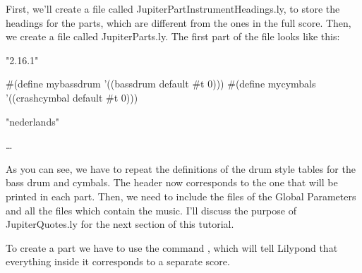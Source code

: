 \documentclass[../../LilyPond-Tutorials]{subfiles}
\begin{document}
First, we'll create a file called JupiterPartInstrumentHeadings.ly, to store the headings for the parts, which are different from the ones in the full score.
Then, we create a file called JupiterParts.ly.
The first part of the file looks like this:

\begin{lilypondcode}
\version "2.16.1"


#(define mybassdrum '((bassdrum default #t 0)))
#(define mycymbals '((crashcymbal default #t 0)))


\language "nederlands"








…



\end{lilypondcode}

As you can see, we have to repeat the definitions of the  drum style tables for the bass drum and cymbals.
The header now corresponds to the one that will be printed in each part.
Then, we need to include the files of the Global Parameters and all the files which contain the music.
I'll discuss the purpose of JupiterQuotes.ly for the next section of this tutorial.

To create a part we have to use the command , which will tell Lilypond that everything inside it corresponds to a separate score.

\begin{lilypondcode}
\end{lilypondcode}
\end{document}
